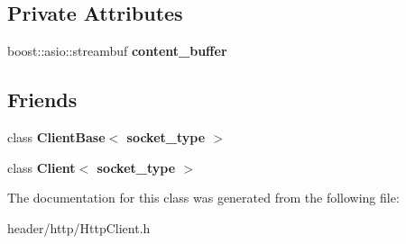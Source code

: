 \subsection*{Private Attributes}
\begin{DoxyCompactItemize}
\item 
\mbox{\label{classhttp_1_1_client_base_1_1_response_a5eb8482d26c147eed4426d793884aef8}} 
boost\+::asio\+::streambuf {\bfseries content\+\_\+buffer}
\end{DoxyCompactItemize}
\subsection*{Friends}
\begin{DoxyCompactItemize}
\item 
\mbox{\label{classhttp_1_1_client_base_1_1_response_aee5298660229dd276c7169cf7ef3d387}} 
class {\bfseries Client\+Base$<$ socket\+\_\+type $>$}
\item 
\mbox{\label{classhttp_1_1_client_base_1_1_response_adb9f3938c0e5fcb2b232ca66a7089335}} 
class {\bfseries Client$<$ socket\+\_\+type $>$}
\end{DoxyCompactItemize}


The documentation for this class was generated from the following file\+:\begin{DoxyCompactItemize}
\item 
header/http/Http\+Client.\+h\end{DoxyCompactItemize}
